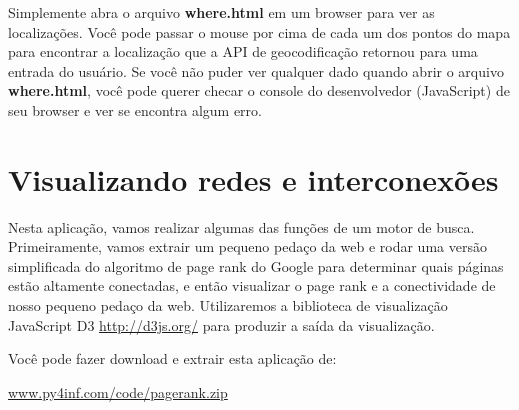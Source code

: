 Simplemente abra o arquivo {\bf where.html} em um browser para ver as
localizações. Você pode passar o mouse por cima de cada um dos pontos 
do mapa para encontrar a localização que a API de geocodificação retornou
para uma entrada do usuário. Se você não puder ver qualquer dado quando
abrir o arquivo {\bf where.html}, você pode querer checar o console do
desenvolvedor (JavaScript) de seu browser e ver se encontra algum erro.

\section{Visualizando redes e interconexões}

Nesta aplicação, vamos realizar algumas das funções de um motor de busca.
Primeiramente, vamos extrair um pequeno pedaço da web e rodar
uma versão simplificada do algoritmo de page rank do Google para determinar
quais páginas estão altamente conectadas, e então visualizar o page rank
e a conectividade de nosso pequeno pedaço da web.
Utilizaremos a biblioteca de visualização JavaScript D3 \url{http://d3js.org/}
para produzir a saída da visualização.

Você pode fazer download e extrair esta aplicação de:

\url{www.py4inf.com/code/pagerank.zip}

